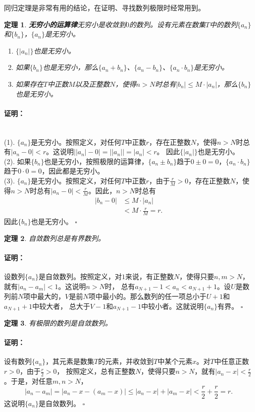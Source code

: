 \documentclass[12pt,UTF8]{ctexbook}
\newtheorem{tm}{定理}[section]
\renewenvironment{proof}{\paragraph{\textbf{证明：}}}{\hfill$\square$}
\begin{document}
\begin{appendix}
同归定理是非常有用的结论，在证明、寻找数列极限时经常用到。

\begin{tm}{\textbf{无穷小的运算律}}\label{tm:a-0-50}
    无穷小是收敛到$0$的数列。设有元素在数集$T$中的数列$\{a_n\}$和$\{b_n\}$，$\{a_n\}$是无穷小。
    \begin{enumerate}
        \item $\{|a_n|\}$也是无穷小。
        \item 如果$\{b_n\}$也是无穷小，那么$\{a_n + b_n\}$、$\{a_n - b_n\}$、$\{a_n\cdot b_n\}$是无穷小。
        \item 如果存在$T$中正数$M$以及正整数$N$，使得$n>N$时总有$|b_n| \leqslant M\cdot |a_n|$，那么$\{b_n\}$也是无穷小。
    \end{enumerate}
\end{tm}
\begin{proof}
    \mbox{} \\
    (1). $\{a_n\}$是无穷小。按照定义，对任何$T$中正数$r$，存在正整数$N$，使得$n>N$时总有$|a_n - 0| < r$。这说明$\big||a_n| - 0\big| = \big||a_n|\big| = |a_n| < r$。
    因此$\{|a_n|\}$也是无穷小。\\
    (2). 如果$\{b_n\}$也是无穷小，按照极限的运算律，$\{a_n \pm b_n\}$趋于$0 \pm 0 = 0$，$\{a_n \cdot b_n\}$趋于$0 \cdot 0 = 0$，因此都是无穷小。\\
    (3). $\{a_n\}$是无穷小。按照定义，对任何$T$中正数$r$，由于$\frac{r}{M} > 0$，存在正整数$N$，使得$n>N$时总有$|a_n - 0| < \frac{r}{M}$。因此，$n>N$时总有
    \begin{align*}
        |b_n - 0| &\leqslant M\cdot |a_n|  \\ 
        &< M\cdot \frac{r}{M} = r.  
    \end{align*}
    因此$\{b_n\}$也是无穷小。
\end{proof}

\begin{tm}\label{tm:a-0-60}
    自敛数列总是有界数列。
\end{tm}
\begin{proof}
    设数列$\{a_n\}$是自敛数列。按照定义，对$1$来说，有正整数$N$，使得只要$n,m>N$，就有$|a_n - a_m| < 1$。这说明$n>N$时，
    总有$a_{N+1} - 1 < a_n < a_{N+1} + 1$。设$U$是数列前$N$项中最大的，$V$是前$N$项中最小的。那么数列的任一项总小于$U+1$和$a_{N+1}+1$中较大者，
    总大于$V-1$和$a_{N+1}-1$中较小者。这就说明$\{a_n\}$有界。
\end{proof}

\begin{tm}\label{tm:a-0-70}
    有极限的数列是自敛数列。
\end{tm}
\begin{proof}
    设有数列$\{a_n\}$，其元素是数集$T$的元素，并收敛到$T$中某个元素$x$。对$T$中任意正数$r>0$，由于$\frac{r}{2}>0$，
    按照定义，总有正整数$N$，使得只要$n>N$，就有$|a_n - x| < \frac{r}{2}$。于是，对任意$m,n>N$，
    $$ |a_n - a_m| = |a_n - x - (a_m - x)| \leqslant |a_n - x| + |a_m - x| < \frac{r}{2} + \frac{r}{2} = r.$$
    这说明$\{a_n\}$是自敛数列。
\end{proof}


\end{appendix}
\end{document}
